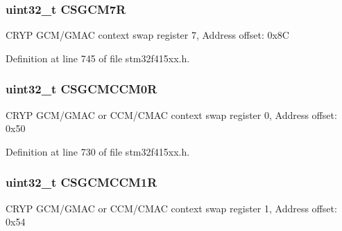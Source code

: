 \subsubsection[{\texorpdfstring{C\+S\+G\+C\+M7R}{CSGCM7R}}]{ uint32\+\_\+t C\+S\+G\+C\+M7R}\hypertarget{struct_c_r_y_p___type_def_a64151eda4e4e3370f4e264a2d9f61776}{}\label{struct_c_r_y_p___type_def_a64151eda4e4e3370f4e264a2d9f61776}
C\+R\+YP G\+C\+M/\+G\+M\+AC context swap register 7, Address offset\+: 0x8C 

Definition at line 745 of file stm32f415xx.\+h.

\subsubsection[{\texorpdfstring{C\+S\+G\+C\+M\+C\+C\+M0R}{CSGCMCCM0R}}]{ uint32\+\_\+t C\+S\+G\+C\+M\+C\+C\+M0R}\hypertarget{struct_c_r_y_p___type_def_a39e00067c0a87ebe4b0820ec414011b0}{}\label{struct_c_r_y_p___type_def_a39e00067c0a87ebe4b0820ec414011b0}
C\+R\+YP G\+C\+M/\+G\+M\+AC or C\+C\+M/\+C\+M\+AC context swap register 0, Address offset\+: 0x50 

Definition at line 730 of file stm32f415xx.\+h.

\subsubsection[{\texorpdfstring{C\+S\+G\+C\+M\+C\+C\+M1R}{CSGCMCCM1R}}]{ uint32\+\_\+t C\+S\+G\+C\+M\+C\+C\+M1R}\hypertarget{struct_c_r_y_p___type_def_a9e5051604453703d76973463cdba6ef7}{}\label{struct_c_r_y_p___type_def_a9e5051604453703d76973463cdba6ef7}
C\+R\+YP G\+C\+M/\+G\+M\+AC or C\+C\+M/\+C\+M\+AC context swap register 1, Address offset\+: 0x54 

